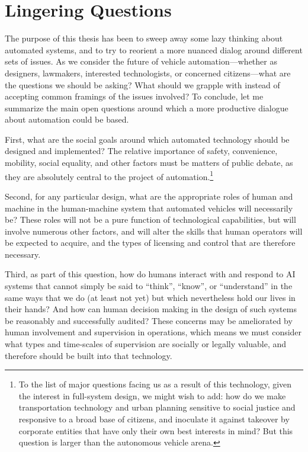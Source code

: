 \section{Lingering Questions}

The purpose of this thesis has been to sweep away some lazy thinking
about automated systems, and to try to reorient a more nuanced dialog
around different sets of issues. As we consider the future of
vehicle automation---whether as
designers, lawmakers, interested technologists, or concerned
citizens---what are the questions we should be asking? What should we
grapple with instead of accepting common framings of the issues
involved? To conclude, let me summarize the main open questions around
which a more productive dialogue about automation could be based.

First, what are the social goals around which automated technology
should be designed and implemented? The relative importance of safety,
convenience, mobility, social equality, and other factors must be
matters of public debate, as they are absolutely central to the
project of automation.\footnote{To the list
of major questions facing us as a result of this technology, given the
interest in full-system design, we might
wish to
add: how do we make transportation technology and urban planning sensitive to social
justice and responsive to a broad base of citizens, and inoculate it
against takeover by corporate entities that have only their own best interests
in mind? But this question is larger than the autonomous vehicle arena.}

Second, for any particular design, what are the appropriate roles of
human and machine in the human-machine system that automated vehicles
will necessarily be? These roles will not be a pure function of
technological capabilities, but will involve numerous other factors,
and will alter the skills that human operators will be expected to
acquire, and the types of licensing and control that are therefore
necessary. 

Third, as part of this question, how do humans interact with and
respond to AI systems that cannot simply be said to
``think'', ``know'', or ``understand'' in the same ways that we do (at
least not yet) but which nevertheless hold our lives in their hands?
And how can human decision making in the design of such systems be
reasonably and successfully audited?
These concerns may be ameliorated by human involvement and
supervision in operations, which means we must consider what types and
time-scales of supervision are socially or legally valuable, and
therefore should be built into that technology. 

